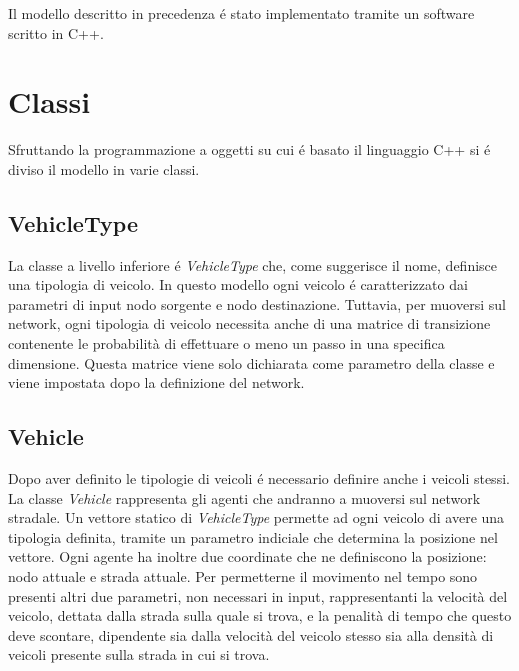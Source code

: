 \documentclass[../main.tex]{subfiles}
\begin{document}
Il modello descritto in precedenza \'e stato implementato tramite un software scritto in C++.
\section{Classi}
Sfruttando la programmazione a oggetti su cui \'e basato il linguaggio C++ si \'e diviso il modello in varie classi.
\subsection{VehicleType}
La classe a livello inferiore \'e \emph{VehicleType} che, come suggerisce il nome, definisce una tipologia di veicolo.
In questo modello ogni veicolo \'e caratterizzato dai parametri di input nodo sorgente e nodo destinazione.
Tuttavia, per muoversi sul network, ogni tipologia di veicolo necessita anche di una matrice di transizione contenente le probabilità di effettuare o meno un passo in una specifica dimensione.
Questa matrice viene solo dichiarata come parametro della classe e viene impostata dopo la definizione del network.
\subsection{Vehicle}
Dopo aver definito le tipologie di veicoli \'e necessario definire anche i veicoli stessi.
La classe \emph{Vehicle} rappresenta gli agenti che andranno a muoversi sul network stradale.
Un vettore statico di \emph{VehicleType} permette ad ogni veicolo di avere una tipologia definita, tramite un parametro indiciale che determina la posizione nel vettore.
Ogni agente ha inoltre due coordinate che ne definiscono la posizione: nodo attuale e strada attuale.
Per permetterne il movimento nel tempo sono presenti altri due parametri, non necessari in input, rappresentanti la velocità del veicolo, dettata dalla strada sulla quale si trova, e la penalità di tempo che questo deve scontare, dipendente sia dalla velocità del veicolo stesso sia alla densità di veicoli presente sulla strada in cui si trova.
\end{document}
